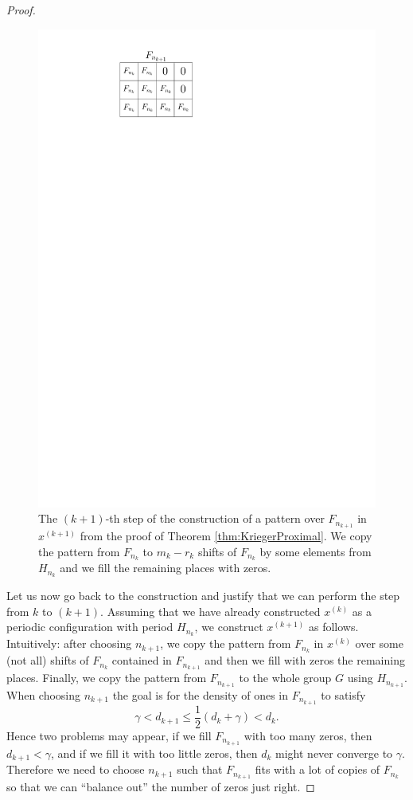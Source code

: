 \begin{proof}
\begin{figure}
\centering
\includegraphics[scale=1.3]{../Graphics/obrazek_prox.pdf}
\caption{The $(k+1)$-th step of the construction of a pattern over $F_{n_{k+1}}$ in $x^{(k+1)}$ from the proof of Theorem \ref{thm:KriegerProximal}. We copy the pattern from $F_{n_k}$ to $m_k-r_k$ shifts of $F_{n_k}$ by some elements from $H_{n_k}$ and we fill the remaining places with zeros.}\label{fig:constr_prox}
\end{figure}


Let us now go back to the construction and justify that we can perform the step from $k$ to $(k+1)$.
%
Assuming that we have already constructed $x^{(k)}$ as a periodic configuration with period $H_{n_k}$, we construct $x^{(k+1)}$ as follows.
%
Intuitively: after choosing $n_{k+1}$, we copy the pattern from $F_{n_k}$ in $x^{(k)}$ over some (not all) shifts of $F_{n_k}$ contained in $F_{n_{k+1}}$ and then we fill with zeros the remaining places.
%
Finally, we copy the pattern from $F_{n_{k+1}}$ to the whole group $G$ using $H_{n_{k+1}}$.
%
When choosing  ${n_{k+1}}$ the goal is for the density of ones in $F_{n_{k+1}}$ to satisfy 
\[
\gamma<d_{k+1}\leq\frac{1}{2}(d_k+\gamma)<d_k .
\]
Hence two problems may appear, if we fill $F_{n_{k+1}}$ with too many zeros, then $d_{k+1}<\gamma$, and if we fill it with too little zeros, then $d_k$ might never converge to $\gamma$. Therefore we need to choose $n_{k+1}$ such that $F_{n_{k+1}}$ fits with a lot of copies of $F_{n_k}$ so that we can ``balance out'' the number of zeros just right.



\end{proof}
